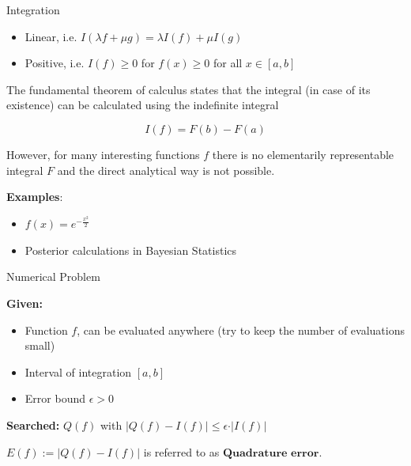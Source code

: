 \begin{vbframe}{Integration}
\begin{itemize}
\item Linear, i.e. $I(\lambda f + \mu g) = \lambda I(f) + \mu I(g)$
\item Positive, i.e. $I(f) \ge 0$ for $f(x) \ge 0$ for all $x \in [a, b]$
\end{itemize}

\framebreak

%

The fundamental theorem of calculus states that the integral (in case of its existence) can be calculated using the indefinite integral

$$
I(f) = F(b) - F(a)
$$

However, for many interesting functions $f$ there is no elementarily representable integral $F$ and the direct analytical way is not possible.

\lz

\vspace*{-0.4cm}
\textbf{Examples}:
\begin{itemize}
\item $f(x)=e^{-\frac{x^2}2}$
\item Posterior calculations in Bayesian Statistics
\end{itemize}
\end{vbframe}



\begin{vbframe}{Numerical Problem}

\textbf{Given:}
\begin{itemize}
\item Function $f$, can be evaluated anywhere (try to keep the number of evaluations small)
\item Interval of integration $[a, b]$
\item Error bound $\epsilon > 0$
\end{itemize}

\lz

\textbf{Searched:} $Q(f)$ with $\vert Q(f) - I(f) \vert \le \epsilon \cdot \vert I(f) \vert$

\lz

$E(f) := |Q(f) - I(f)|$ is referred to as $\textbf{Quadrature error}$.

%
\end{vbframe}

